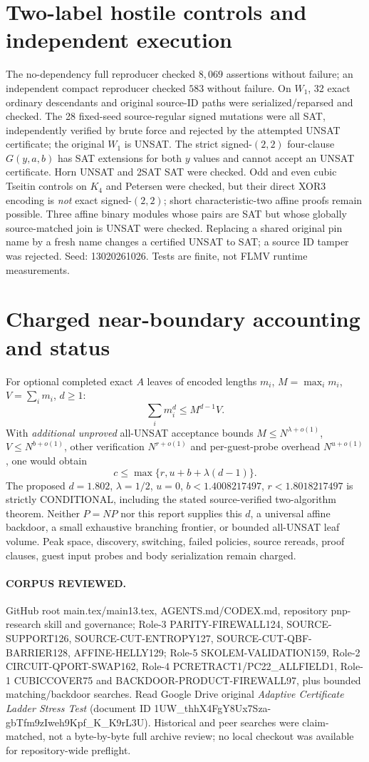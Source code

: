 \documentclass[11pt]{article}
\begin{document}
\section{Two-label hostile controls and independent execution}
The no-dependency full reproducer checked $8,069$ assertions without failure; an independent compact reproducer checked $583$ without failure. On $W_1$, 32 exact ordinary descendants and original source-ID paths were serialized/reparsed and checked. The 28 fixed-seed source-regular signed mutations were all SAT, independently verified by brute force and rejected by the attempted UNSAT certificate; the original $W_1$ is UNSAT. The strict signed-$(2,2)$ four-clause $G(y,a,b)$ has SAT extensions for both $y$ values and cannot accept an UNSAT certificate. Horn UNSAT and 2SAT SAT were checked. Odd and even cubic Tseitin controls on $K_4$ and Petersen were checked, but their direct XOR3 encoding is \emph{not} exact signed-$(2,2)$; short characteristic-two affine proofs remain possible. Three affine binary modules whose pairs are SAT but whose globally source-matched join is UNSAT were checked. Replacing a shared original pin name by a fresh name changes a certified UNSAT to SAT; a source ID tamper was rejected. Seed: 13020261026. Tests are finite, not FLMV runtime measurements.
\section{Charged near-boundary accounting and status}
For optional completed exact $A$ leaves of encoded lengths $m_i$, $M=\max_i m_i$, $V=\sum_i m_i$, $d\ge1$:
\[
\sum_i m_i^d\le M^{d-1}V.
\]
With \emph{additional unproved} all-UNSAT acceptance bounds $M\le N^{\lambda+o(1)}$, $V\le N^{b+o(1)}$, other verification $N^{r+o(1)}$ and per-guest-probe overhead $N^{u+o(1)}$, one would obtain
\[
c\le\max\{r,u+b+\lambda(d-1)\}.
\]
The proposed $d=1.802$, $\lambda=1/2$, $u=0$, $b<1.4008217497$, $r<1.8018217497$ is strictly CONDITIONAL, including the stated source-verified two-algorithm theorem. Neither $P=NP$ nor this report supplies this $d$, a universal affine backdoor, a small exhaustive branching frontier, or bounded all-UNSAT leaf volume. Peak space, discovery, switching, failed policies, source rereads, proof clauses, guest input probes and body serialization remain charged.

\paragraph{CORPUS REVIEWED.} GitHub root main.tex/main13.tex, AGENTS.md/CODEX.md, repository pnp-research skill and governance; Role-3 PARITY-FIREWALL124, SOURCE-SUPPORT126, SOURCE-CUT-ENTROPY127, SOURCE-CUT-QBF-BARRIER128, AFFINE-HELLY129; Role-5 SKOLEM-VALIDATION159, Role-2 CIRCUIT-QPORT-SWAP162, Role-4 PCRETRACT1/PC22_ALLFIELD1, Role-1 CUBICCOVER75 and BACKDOOR-PRODUCT-FIREWALL97, plus bounded matching/backdoor searches. Read Google Drive original \emph{Adaptive Certificate Ladder Stress Test} (document ID 1UW\_thhX4FgY8Ux7Sza-gbTfm9zIweh9Kpf\_K\_K9rL3U). Historical and peer searches were claim-matched, not a byte-by-byte full archive review; no local checkout was available for repository-wide preflight.
\end{document}
